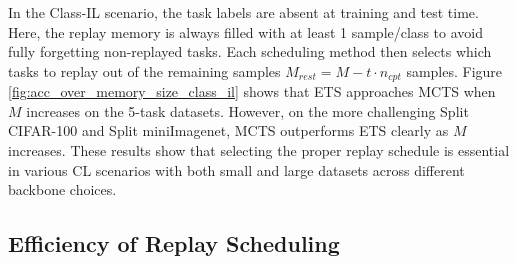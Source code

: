 In the Class-IL scenario, the task labels are absent at training and test time. Here, the replay memory is always filled with at least 1 sample/class to avoid fully forgetting non-replayed tasks. Each scheduling method then selects which tasks to replay out of the remaining samples $M_{rest} = M - t \cdot n_{cpt}$ samples. 
Figure \ref{fig:acc_over_memory_size_class_il} shows that ETS approaches MCTS when $M$ increases on the 5-task datasets. However, on the more challenging Split CIFAR-100 and Split miniImagenet, MCTS outperforms ETS clearly as $M$ increases. These results show that selecting the proper replay schedule is essential in various CL scenarios with both small and large datasets across different backbone choices.







%
\subsection{Efficiency of Replay Scheduling}
\label{paperC:sec:efficiency_of_replay_scheduling}

